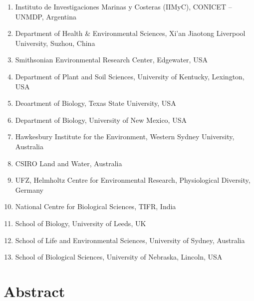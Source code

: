 \documentclass[twoside,12pt,final]{ucthesis-CA2012}
\begin{document}
\begin{ucmainmatter}
\begin{enumerate}
\item
  Instituto de Investigaciones Marinas y Costeras (IIMyC), CONICET -- UNMDP, Argentina
\item
  Department of Health \& Environmental Sciences, Xi'an Jiaotong Liverpool University, Suzhou, China
\item
  Smithsonian Environmental Research Center, Edgewater, USA
\item
  Department of Plant and Soil Sciences, University of Kentucky, Lexington, USA
\item
  Deoartment of Biology, Texas State University, USA
\item
  Department of Biology, University of New Mexico, USA
\item
  Hawkesbury Institute for the Environment, Western Sydney University, Australia
\item
  CSIRO Land and Water, Australia
\item
  UFZ, Helmholtz Centre for Environmental Research, Physiological Diversity, Germany
\item
  National Centre for Biological Sciences, TIFR, India
\item
  School of Biology, University of Leeds, UK
\item
  School of Life and Environmental Sciences, University of Sydney, Australia
\item
  School of Biological Sciences, University of Nebraska, Lincoln, USA
\end{enumerate}
\hypertarget{abstract}{%
\section{Abstract}\label{abstract}}


\end{ucmainmatter}
\end{document}
